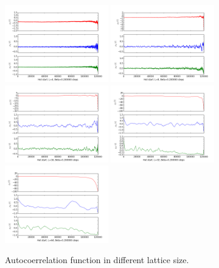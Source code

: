 \documentclass[12pt]{article}
\begin{document}
\begin{figure}[h!]
	\begin{center}
		\includegraphics[width=0.4\textwidth]{exp2/Hot_L_4_Beta_2_iter_120000.png}
		\includegraphics[width=0.4\textwidth]{exp2/Hot_L_8_Beta_2_iter_120000.png}
		\includegraphics[width=0.4\textwidth]{exp2/Hot_L_16_Beta_2_iter_120000.png}
		\includegraphics[width=0.4\textwidth]{exp2/Hot_L_32_Beta_2_iter_120000.png}
		\includegraphics[width=0.4\textwidth]{exp2/Hot_L_64_Beta_2_iter_120000.png}
		\caption{Autocoerrelation function in different lattice size.}
		\label{fig4}
	\end{center}
\end{figure}
\end{document}
